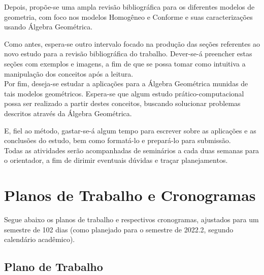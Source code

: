 \documentclass[11pt]{article}
\begin{document}
Depois, propõe-se uma ampla revisão bibliográfica para os diferentes modelos de geometria, com foco nos modelos Homogêneo e Conforme e suas caracterizações usando Álgebra Geométrica.

Como antes, espera-se outro intervalo focado na produção das seções referentes ao novo estudo para a revisão bibliográfica do trabalho. Dever-se-á preencher estas seções com exemplos e imagens, a fim de que se possa tomar como intuitiva a manipulação dos conceitos após a leitura.
\\

Por fim, deseja-se estudar a aplicações para a Álgebra Geométrica munidas de tais modelos geométricos. Espera-se que algum estudo prático-computacional possa ser realizado a partir destes conceitos, buscando solucionar problemas descritos através da Álgebra Geométrica.

E, fiel ao método, gastar-se-á algum tempo para escrever sobre as aplicações e as conclusões do estudo, bem como formatá-lo e prepará-lo para submissão. 
\\

Todas as atividades serão acompanhadas de seminários a cada duas semanas para o orientador, a fim de dirimir eventuais dúvidas e traçar planejamentos.

\section{Planos de Trabalho e Cronogramas}

Segue abaixo os planos de trabalho e respectivos cronogramas, ajustados para um semestre de 102 dias (como planejado para o semestre de 2022.2, segundo calendário acadêmico).
	
	\subsection{Plano de Trabalho}
	
\end{document}
